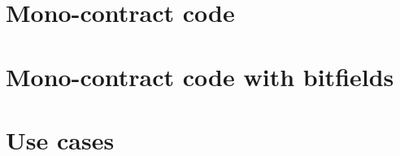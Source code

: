 \documentclass{article}
\begin{document}
		

	\section{Mono-contract code}

		

	\section{Mono-contract code with bitfields}
		\label{app:mono-contract-code-with-bitfields}


		

	\section{Use cases}
\end{document}
